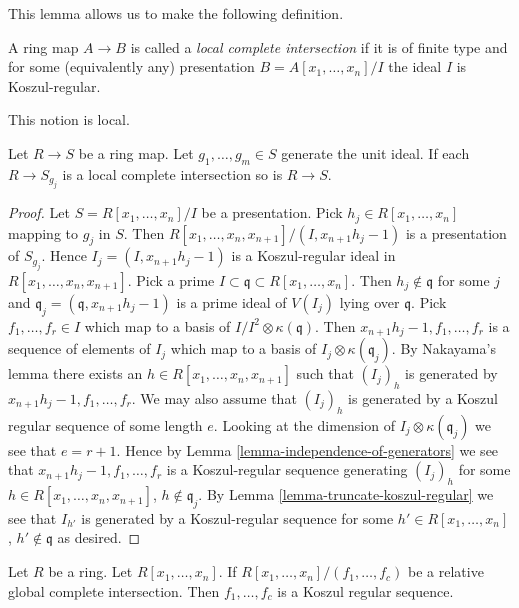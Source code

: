 \noindent
This lemma allows us to make the following definition.

\begin{definition}
\label{definition-local-complete-intersection}
A ring map $A \to B$ is called a {\it local complete intersection}
if it is of finite type and for some (equivalently any) presentation
$B = A[x_1, \ldots, x_n]/I$ the ideal $I$ is Koszul-regular.
\end{definition}

\noindent
This notion is local.

\begin{lemma}
\label{lemma-lci-local}
Let $R \to S$ be a ring map. Let $g_1, \ldots, g_m \in S$
generate the unit ideal. If each $R \to S_{g_j}$ is a local
complete intersection so is $R \to S$.
\end{lemma}

\begin{proof}
Let $S = R[x_1, \ldots, x_n]/I$ be a presentation. Pick
$h_j \in R[x_1, \ldots, x_n]$ mapping to $g_j$ in $S$.
Then $R[x_1, \ldots, x_n, x_{n + 1}]/(I, x_{n + 1}h_j - 1)$
is a presentation of $S_{g_j}$. Hence
$I_j = (I, x_{n + 1}h_j - 1)$ is a Koszul-regular ideal in
$R[x_1, \ldots, x_n, x_{n + 1}]$. Pick a prime
$I \subset \mathfrak q \subset R[x_1, \ldots, x_n]$.
Then $h_j \not \in \mathfrak q$ for some $j$ and
$\mathfrak q_j = (\mathfrak q, x_{n + 1}h_j - 1)$ is a prime
ideal of $V(I_j)$ lying over $\mathfrak q$.
Pick $f_1, \ldots, f_r \in I$ which map to a basis of
$I/I^2 \otimes \kappa(\mathfrak q)$. Then
$x_{n + 1}h_j - 1, f_1, \ldots, f_r$ is a sequence of elements of $I_j$
which map to a basis of $I_j \otimes \kappa(\mathfrak q_j)$.
By Nakayama's lemma there exists an $h \in R[x_1, \ldots, x_n, x_{n + 1}]$
such that $(I_j)_h$ is generated by $x_{n + 1}h_j - 1, f_1, \ldots, f_r$.
We may also assume that $(I_j)_h$ is generated by a Koszul regular
sequence of some length $e$. Looking at the dimension of
$I_j \otimes \kappa(\mathfrak q_j)$ we see that $e = r + 1$.
Hence by
Lemma \ref{lemma-independence-of-generators}
we see that $x_{n + 1}h_j - 1, f_1, \ldots, f_r$ is a
Koszul-regular sequence generating $(I_j)_h$ for some
$h \in R[x_1, \ldots, x_n, x_{n + 1}]$, $h \not \in \mathfrak q_j$. By
Lemma \ref{lemma-truncate-koszul-regular}
we see that $I_{h'}$ is generated by a Koszul-regular sequence for some
$h' \in R[x_1, \ldots, x_n]$, $h' \not \in \mathfrak q$ as desired.
\end{proof}

\begin{lemma}
\label{lemma-relative-global-complete-intersection-koszul}
Let $R$ be a ring. Let
$R[x_1, \ldots, x_n]$. If $R[x_1, \ldots, x_n]/(f_1, \ldots, f_c)$
be a relative global complete intersection. Then $f_1, \ldots, f_c$
is a Koszul regular sequence.
\end{lemma}

